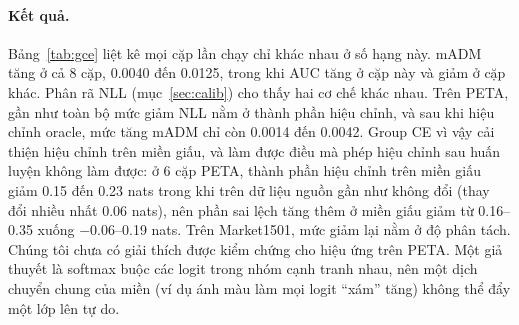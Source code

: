 \documentclass[11pt,a4paper]{article}
\begin{document}
\paragraph{Kết quả.} Bảng~\ref{tab:gce} liệt kê mọi cặp lần chạy chỉ khác nhau ở số hạng này. mADM tăng ở cả 8 cặp, 0.0040 đến 0.0125, trong khi AUC tăng ở cặp này và giảm ở cặp khác. Phân rã NLL (mục~\ref{sec:calib}) cho thấy hai cơ chế khác nhau. Trên PETA, gần như toàn bộ mức giảm NLL nằm ở thành phần hiệu chỉnh, và sau khi hiệu chỉnh oracle, mức tăng mADM chỉ còn 0.0014 đến 0.0042. Group CE vì vậy cải thiện hiệu chỉnh trên miền giấu, và làm được điều mà phép hiệu chỉnh sau huấn luyện không làm được: ở 6 cặp PETA, thành phần hiệu chỉnh trên miền giấu giảm 0.15 đến 0.23 nats trong khi trên dữ liệu nguồn gần như không đổi (thay đổi nhiều nhất 0.06 nats), nên phần sai lệch tăng thêm ở miền giấu giảm từ 0.16--0.35 xuống $-0.06$--0.19 nats. Trên Market1501, mức giảm lại nằm ở độ phân tách. Chúng tôi chưa có giải thích được kiểm chứng cho hiệu ứng trên PETA. Một giả thuyết là softmax buộc các logit trong nhóm cạnh tranh nhau, nên một dịch chuyển chung của miền (ví dụ ánh màu làm mọi logit ``xám'' tăng) không thể đẩy một lớp lên tự do.

\begin{table}[H]
\centering\small
{}
\caption{Entropy chéo theo nhóm trên 8 cặp lần chạy chỉ khác nhau ở số hạng này. NLL và hai thành phần của nó tính bằng nats; mADM$_{\text{oracle}}$ là mADM sau hiệu chỉnh oracle.}
\label{tab:gce}
\end{table}
\end{document}
